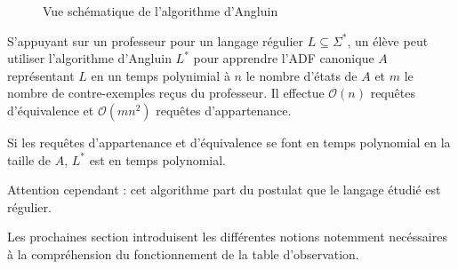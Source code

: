 \begin{figure}[H]
	\centering
\caption{Vue schématique de l'algorithme d'Angluin}
\end{figure}

\begin{theorem}
	S'appuyant sur un professeur pour un langage régulier $L\subseteq\Sigma^*$, un élève peut utiliser l'algorithme d'Angluin $L^*$ pour apprendre l'ADF canonique $A$ représentant $L$ en un temps polynimial à $n$ le nombre d'états de $A$ et $m$ le nombre de contre-exemples reçus du professeur.
	Il effectue $\mathcal{O}(n)$ requêtes d'équivalence et $\mathcal{O}(mn^2)$ requêtes d'appartenance.\cite{Angluin87}
\end{theorem}

\begin{corollary}
	Si les requêtes d'appartenance et d'équivalence se font en temps polynomial en la taille de $A$, $L^*$ est en temps polynomial.
\end{corollary}

Attention cependant : cet algorithme part du postulat que le langage étudié est régulier.

Les prochaines section introduisent les différentes notions notemment necéssaires à la compréhension du fonctionnement de la table d'observation.


